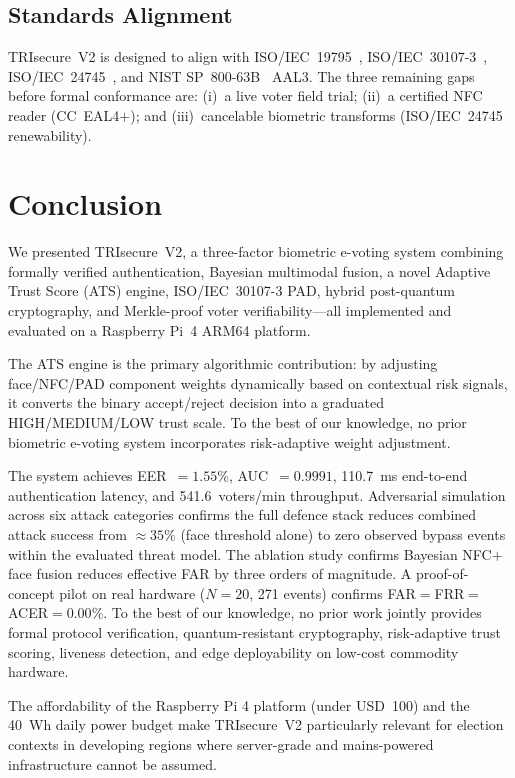 \documentclass[submission]{sacjsub}
\begin{document}
\subsection{Standards Alignment}

TRIsecure~V2 is designed to align with ISO/IEC~19795~\cite{iso19795},
ISO/IEC~30107-3~\cite{iso30107}, ISO/IEC~24745~\cite{iso24745},
and NIST SP~800-63B~\cite{nist_sp800_63b} AAL3. The three remaining
gaps before formal conformance are: (i)~a live voter field trial;
(ii)~a certified NFC reader (CC~EAL4\(+\)); and (iii)~cancelable
biometric transforms (ISO/IEC~24745 renewability).

\section{Conclusion}\label{sec:conclusion}

We presented TRIsecure~V2, a three-factor biometric e-voting system
combining formally verified authentication, Bayesian multimodal fusion,
a novel Adaptive Trust Score (ATS) engine, ISO/IEC~30107-3 PAD, hybrid
post-quantum cryptography, and Merkle-proof voter verifiability---all
implemented and evaluated on a Raspberry Pi~4 ARM64 platform.

The ATS engine is the primary algorithmic contribution: by adjusting
face/NFC/PAD component weights dynamically based on contextual risk
signals, it converts the binary accept/reject decision into a graduated
HIGH/MEDIUM/LOW trust scale. To the best of our knowledge, no prior
biometric e-voting system incorporates risk-adaptive weight adjustment.

The system achieves EER~\(=1.55\%\), AUC~\(=0.9991\), 110.7~ms
end-to-end authentication latency, and 541.6~voters/min throughput.
Adversarial simulation across six attack categories confirms the full
defence stack reduces combined attack success from \(\approx35\%\)
(face threshold alone) to zero observed bypass events within the
evaluated threat model. The ablation study confirms Bayesian
NFC\(+\)face fusion reduces effective FAR by three orders of magnitude.
A proof-of-concept pilot on real hardware (\(N{=}20\), 271 events)
confirms FAR\(=\)FRR\(=\)ACER\(=0.00\%\). To the best of our
knowledge, no prior work jointly provides formal protocol verification,
quantum-resistant cryptography, risk-adaptive trust scoring, liveness
detection, and edge deployability on low-cost commodity hardware.

The affordability of the Raspberry Pi 4 platform (under USD~100)
and the 40~Wh daily power budget make TRIsecure~V2 particularly
relevant for election contexts in developing regions where server-grade
and mains-powered infrastructure cannot be assumed.
\end{document}
